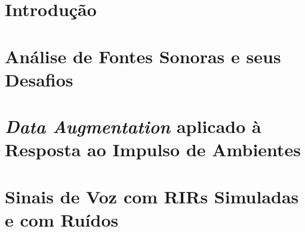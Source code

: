 \documentclass[a4paper,12pt,oneside,openany]{book}
\begin{document}
\frontmatter
\thispagestyle{empty}



\pagebreak            



\tableofcontents
\listoffigures
\listoftables

\mainmatter
\cleardoublepage
\chapter{Introdução}
\label{cap1}


\chapter{Análise de Fontes Sonoras e seus Desafios}
\label{cap2}


\chapter{\textit{Data Augmentation} aplicado à Resposta ao Impulso de Ambientes}
\label{cap3}


\chapter{Sinais de Voz com RIRs Simuladas e com Ruídos}
\label{cap4}

\end{document}
